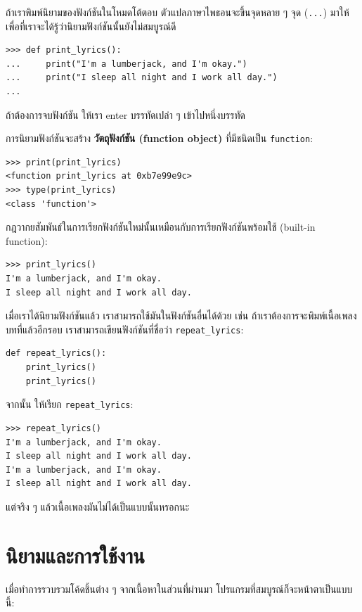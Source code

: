 ถ้าเราพิมพ์นิยามของฟังก์ชันในโหมดโต้ตอบ ตัวแปลภาษาไพธอนจะขึ้นจุดหลาย ๆ จุด ({\tt ...}) มาให้
เพื่อที่เราจะได้รู้ว่านิยามฟังก์ชันนั้นยังไม่สมบูรณ์ดี 

\begin{verbatim}
>>> def print_lyrics():
...     print("I'm a lumberjack, and I'm okay.")
...     print("I sleep all night and I work all day.")
...
\end{verbatim}
%
ถ้าต้องการจบฟังก์ชัน ให้เรา enter บรรทัดเปล่า ๆ เข้าไปหนึ่งบรรทัด

การนิยามฟังก์ชันจะสร้าง {\bf วัตถุฟังก์ชัน (function object)} ที่มีชนิดเป็น \verb"function":

\begin{verbatim}
>>> print(print_lyrics)
<function print_lyrics at 0xb7e99e9c>
>>> type(print_lyrics)
<class 'function'>
\end{verbatim}
%
กฎวากยสัมพันธ์ในการเรียกฟังก์ชันใหม่นั้นเหมือนกับการเรียกฟังก์ชันพร้อมใช้ (built-in function):

\begin{verbatim}
>>> print_lyrics()
I'm a lumberjack, and I'm okay.
I sleep all night and I work all day.
\end{verbatim}
%
เมื่อเราได้นิยามฟังก์ชันแล้ว เราสามารถใช้มันในฟังก์ชันอื่นได้ด้วย เช่น ถ้าเราต้องการจะพิมพ์เนื้อเพลงบทที่แล้วอีกรอบ
เราสามารถเขียนฟังก์ชันที่ชื่อว่า \verb|repeat_lyrics|:

\begin{verbatim}
def repeat_lyrics():
    print_lyrics()
    print_lyrics()
\end{verbatim}
%
จากนั้น ให้เรียก \verb|repeat_lyrics|:

\begin{verbatim}
>>> repeat_lyrics()
I'm a lumberjack, and I'm okay.
I sleep all night and I work all day.
I'm a lumberjack, and I'm okay.
I sleep all night and I work all day.
\end{verbatim}
%
แต่จริง ๆ แล้วเนื้อเพลงมันไม่ได้เป็นแบบนั้นหรอกนะ


\section{นิยามและการใช้งาน} %

เมื่อทำการรวบรวมโค้ดชิ้นต่าง ๆ จากเนื้อหาในส่วนที่ผ่านมา โปรแกรมที่สมบูรณ์ก็จะหน้าตาเป็นแบบนี้:

